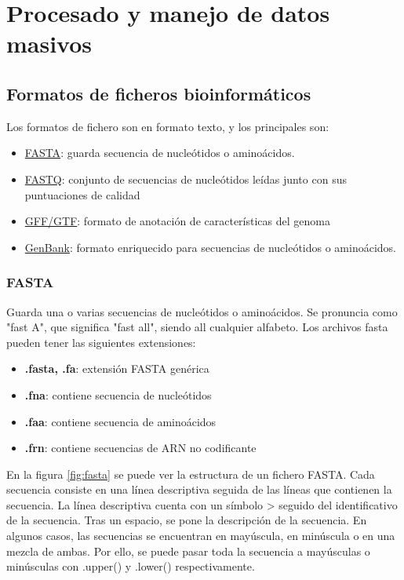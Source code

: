 \chapter{Procesado y manejo de datos masivos}
\section{Formatos de ficheros bioinformáticos}
Los formatos de fichero son en formato texto, y los principales son:
\begin{itemize}
\item \underline{FASTA}: guarda secuencia de nucleótidos o aminoácidos.
\item \underline{FASTQ}: conjunto de secuencias de nucleótidos leídas junto con sus puntuaciones de calidad
\item \underline{GFF/GTF}: formato de anotación de características del genoma
\item \underline{GenBank}: formato enriquecido para secuencias de nucleótidos o aminoácidos.
\end{itemize}

\subsection{FASTA}
Guarda una o varias secuencias de nucleótidos o aminoácidos. Se pronuncia como "fast A", que significa "fast all", siendo all cualquier alfabeto. Los archivos fasta pueden tener las siguientes extensiones:
\begin{itemize}
\item \textbf{.fasta, .fa}: extensión FASTA genérica
\item \textbf{.fna}: contiene secuencia de nucleótidos
\item \textbf{.faa}: contiene secuencia de aminoácidos
\item \textbf{.frn}: contiene secuencias de ARN no codificante
\end{itemize}

En la figura \ref{fig:fasta} se puede ver la estructura de un fichero FASTA. Cada secuencia consiste en una línea descriptiva seguida de las líneas que contienen la secuencia. La línea descriptiva cuenta con un símbolo > seguido del identificativo de la secuencia. Tras un espacio, se pone la descripción de la secuencia. En algunos casos, las secuencias se encuentran en mayúscula, en minúscula o en una mezcla de ambas. Por ello, se puede pasar toda la secuencia a mayúsculas o minúsculas con .upper() y .lower() respectivamente.

